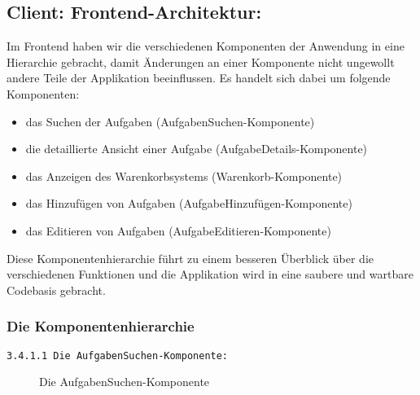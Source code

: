\subsection{Client: Frontend-Architektur:} 

Im Frontend haben wir die verschiedenen Komponenten der Anwendung in eine Hierarchie gebracht, damit Änderungen an einer Komponente nicht ungewollt andere Teile der Applikation beeinflussen. 
Es handelt sich dabei um folgende Komponenten:

\begin{itemize}
  \item das Suchen der Aufgaben (AufgabenSuchen-Komponente)
  
  \item die detaillierte Ansicht einer Aufgabe (AufgabeDetails-Komponente)
\item das Anzeigen des Warenkorbsystems (Warenkorb-Komponente) 
  
  \item das Hinzufügen von Aufgaben (AufgabeHinzufügen-Komponente)
  
  \item das Editieren von Aufgaben (AufgabeEditieren-Komponente)
  

\end{itemize}

Diese Komponentenhierarchie führt zu einem besseren Überblick über die verschiedenen Funktionen und die Applikation wird in eine saubere und wartbare Codebasis gebracht.

\newpage
\subsubsection{Die Komponentenhierarchie}

\texttt{3.4.1.1 Die AufgabenSuchen-Komponente:}
\begin{figure}[ht]
  \caption{Die AufgabenSuchen-Komponente \cite{fig:aufgabensuche}}
\end{figure}


